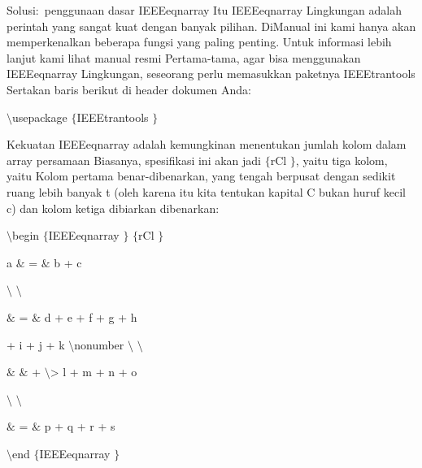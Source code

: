 \vspace{12pt}
\noindent 
Solusi:~penggunaan dasar IEEEeqnarray Itu IEEEeqnarray  Lingkungan adalah perintah yang sangat kuat dengan banyak pilihan. DiManual ini kami hanya akan memperkenalkan beberapa fungsi yang paling penting. Untuk informasi lebih lanjut kami lihat manual resmi Pertama-tama, agar bisa menggunakan IEEEeqnarray Lingkungan, seseorang perlu memasukkan paketnya IEEEtrantools Sertakan baris berikut di header dokumen Anda: \par
\vspace{12pt}
\vspace{12pt}
\noindent 
 $  \setminus  $usepackage $  \{  $IEEEtrantools $  \}  $ \par
\vspace{12pt}
\noindent 
Kekuatan IEEEeqnarray adalah kemungkinan menentukan jumlah kolom dalam array persamaan Biasanya, spesifikasi ini akan jadi  $  \{  $rCl $  \}  $, yaitu tiga kolom, yaitu Kolom pertama benar-dibenarkan, yang tengah berpusat dengan sedikit ruang lebih banyak t (oleh karena itu kita tentukan kapital C bukan huruf kecil c) dan kolom ketiga dibiarkan dibenarkan: \par
\vspace{12pt}
\noindent 
 $  \setminus  $begin $  \{  $IEEEeqnarray $  \}  $ $  \{  $rCl $  \}  $ \par
\vspace{12pt}
\noindent 
a  $  \&  $ =  $  \&  $ b + c \par
\vspace{12pt}
\noindent 
 $  \setminus  $ $  \setminus  $ \par
\vspace{12pt}
\noindent 
 $  \&  $ =  $  \&  $ d + e + f + g + h \par
\vspace{12pt}
\noindent 
+ i + j + k  $  \setminus  $nonumber $  \setminus  $ $  \setminus  $ \par
\vspace{12pt}
\noindent 
 $  \&  $ $  \&  $ + $  \setminus  $> l + m + n + o \par
\vspace{12pt}
\noindent 
 $  \setminus  $ $  \setminus  $ \par
\vspace{12pt}
\noindent 
 $  \&  $ =  $  \&  $ p + q + r + s \par
\vspace{12pt}
\noindent 
 $  \setminus  $end $  \{  $IEEEeqnarray $  \}  $ \par

